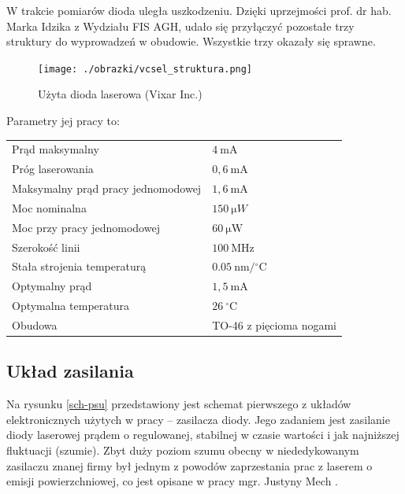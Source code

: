 \documentclass[a4paper,10pt]{article}
\begin{document}
W trakcie pomiarów dioda uległa uszkodzeniu. Dzięki uprzejmości prof. dr hab. Marka Idzika z Wydziału FIS AGH, udało się przyłączyć pozostałe trzy struktury do wyprowadzeń w obudowie.
Wszystkie trzy okazały się sprawne.

\begin{figure}[h!]
\begin{center}
 \texttt{[image: ./obrazki/vcsel\_struktura.png]}
\end{center}
\caption{Użyta dioda laserowa (Vixar Inc.)}
\label{struktura}
\end{figure}


Parametry jej pracy to:
\begin{center}
\begin{tabular}{ll}
Prąd maksymalny & $4 ~\mathrm{mA}$\\
Próg laserowania & $0{,}6~\mathrm{mA}$\\
Maksymalny prąd pracy jednomodowej & $1{,}6~\mathrm{mA}$\\
Moc nominalna & $150~\mathrm{\mu }W$\\
Moc przy pracy jednomodowej & $60~\mathrm{\mu W}$\\
Szerokość linii & $100~\mathrm{MHz}$\\
Stała strojenia temperaturą & $0.05 ~\mathrm{nm/{}^{\circ}C}$\\
Optymalny prąd & $1{,}5 ~\mathrm{mA}$\\
Optymalna temperatura & $26~\mathrm{ {}^{\circ}C}$ \\
Obudowa & TO-46 z pięcioma nogami
\end{tabular}
\end{center}


\subsection{Układ zasilania}

Na rysunku \ref{sch-psu} przedstawiony jest schemat pierwszego z układów elektronicznych użytych w pracy -- zasilacza diody. Jego zadaniem jest zasilanie diody laserowej prądem o regulowanej, stabilnej w czasie wartości i jak najniższej fluktuacji (szumie). Zbyt duży poziom szumu obecny w niededykowanym zasilaczu znanej firmy był jednym z powodów zaprzestania prac z laserem o emisji powierzchniowej, co jest opisane w pracy mgr. Justyny Mech \cite{mgrJustynaMech}.
\end{document}
